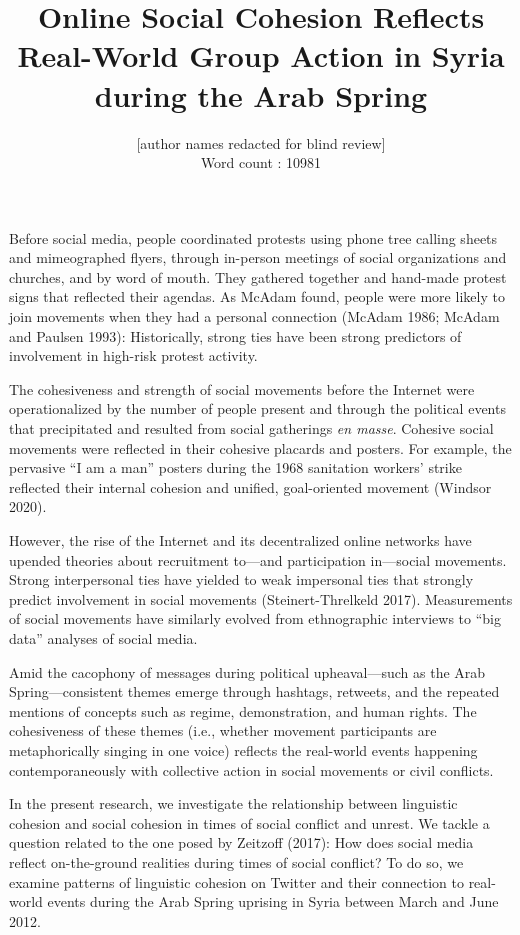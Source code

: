 \documentclass[english,man]{apa6}
\author{[author names redacted for blind review]\\ Word count : 10981}
\affiliation{\phantom{a}}
\title{Online Social Cohesion Reflects Real-World Group Action in Syria during the Arab Spring}
\date{}
\begin{document}
\maketitle

Before social media, people coordinated protests using phone tree calling sheets
and mimeographed flyers, through in-person meetings of social organizations and
churches, and by word of mouth. They gathered together and hand-made protest
signs that reflected their agendas. As McAdam found, people were more likely to
join movements when they had a personal connection (McAdam 1986; McAdam and Paulsen 1993): Historically, strong ties have been strong predictors of
involvement in high-risk protest activity.

The cohesiveness and strength of social movements before the Internet were
operationalized by the number of people present and through the political events
that precipitated and resulted from social gatherings \emph{en masse}. Cohesive
social movements were reflected in their cohesive placards and posters. For
example, the pervasive \enquote{I am a man} posters during the 1968 sanitation workers'
strike reflected their internal cohesion and unified, goal-oriented movement
(Windsor 2020).

However, the rise of the Internet and its decentralized online networks have
upended theories about recruitment to---and participation in---social movements.
Strong interpersonal ties have yielded to weak impersonal ties that strongly
predict involvement in social movements (Steinert-Threlkeld 2017). Measurements
of social movements have similarly evolved from ethnographic interviews to \enquote{big
data} analyses of social media.

Amid the cacophony of messages during political upheaval---such
as the Arab Spring---consistent themes emerge through hashtags, retweets, and
the repeated mentions of concepts such as regime, demonstration, and
human rights. The cohesiveness of these themes (i.e., whether movement
participants are metaphorically singing in one voice) reflects the real-world
events happening contemporaneously with collective action in social movements or
civil conflicts.

In the present research, we investigate the relationship between linguistic
cohesion and social cohesion in times of social conflict and unrest. We tackle a
question related to the one posed by Zeitzoff (2017): How does
social media reflect on-the-ground realities during times of social conflict? To
do so, we examine patterns of linguistic cohesion on Twitter and their
connection to real-world events during the Arab Spring uprising in Syria between
March and June 2012.
\end{document}

